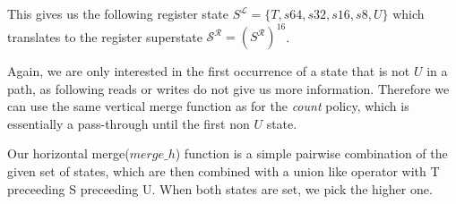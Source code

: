 This gives us the following register state $S^\mathcal{L} = \{ T, s64, s32, s16, s8, U \}$ which translates to the register superstate $\mathcal{S}^\mathcal{R} = (S^\mathcal{R})^{16}$.

Again, we are only interested in the first occurrence of a state that is not $U$ in a path, as following reads or writes do not give us more information. Therefore we can use the same vertical merge function as for the \emph{count} policy, which is essentially a pass-through until the first non $U$ state.


Our horizontal merge($merge\_h$) function is a simple pairwise combination of the given set of states, which are then combined with a union like operator with T preceeding S preceeding U. When both states are set, we pick the higher one.

